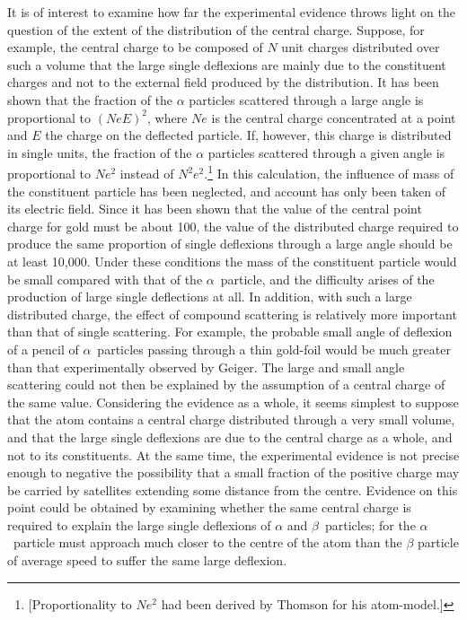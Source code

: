 It is of interest to examine how far the experimental evidence throws
light on the question of the extent of the distribution of the central
charge. Suppose, for example, the central charge to be composed of
$N$ unit charges distributed over such a volume that the large
single deflexions are mainly due to the constituent charges and not to
the external field produced by the distribution. It has been shown that
the fraction of the $\alpha$ particles scattered through a large angle
is proportional to $(NeE)^2$, where $Ne$ is the central charge
concentrated at a point and $E$ the charge on the deflected
particle. If, however, this charge is distributed in single units, the
fraction of the $\alpha$ particles scattered through a given angle is
proportional to $Ne^2$ instead of $N^2e^2$.\footnote{{[}Proportionality
  to $Ne^2$ had been derived by Thomson for his atom-model.{]}} In
this calculation, the influence of mass of the constituent particle has
been neglected, and account has only been taken of its electric field.
Since it has been shown that the value of the central point charge for
gold must be about 100, the value of the distributed charge required to
produce the same proportion of single deflexions through a large angle
should be at least 10,000. Under these conditions the mass of the
constituent particle would be small compared with that of the
$\alpha$~particle, and the difficulty arises of the production of large
single deflections at all. In addition, with such a large distributed
charge, the effect of compound scattering is relatively more important
than that of single scattering. For example, the probable small angle of
deflexion of a pencil of $\alpha$~particles passing through a thin
gold-foil would be much greater than that experimentally observed by
Geiger. The large and small angle scattering could not then be explained
by the assumption of a central charge of the same value. Considering the
evidence as a whole, it seems simplest to suppose that the atom contains
a central charge distributed through a very small volume, and that the
large single deflexions are due to the central charge as a whole, and
not to its constituents. At the same time, the experimental evidence is
not precise enough to negative the possibility that a small fraction of
the positive charge may be carried by satellites extending some distance
from the centre. Evidence on this point could be obtained by examining
whether the same central charge is required to explain the large single
deflexions of $\alpha$ and $\beta$~particles; for the $\alpha$~particle
must approach much closer to the centre of the atom than the $\beta$
particle of average speed to suffer the same large deflexion.

